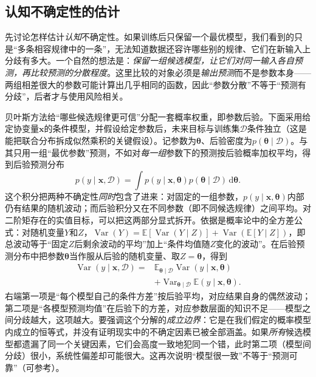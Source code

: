 \subsection{认知不确定性的估计}
\label{sec:reliability-epistemic-estimation}

先讨论怎样估计\emph{认知}不确定性。如果训练后只保留一个最优模型，我们看到的只是“多条相容规律中的一条”，无法知道数据还容许哪些别的规律、它们在新输入上分歧有多大。一个自然的想法是：\emph{保留一组候选模型，让它们对同一输入各自预测，再比较预测的分散程度}。这里比较的对象必须是\emph{输出预测}而不是参数本身——两组相差很大的参数可能计算出几乎相同的函数，因此“参数分散”不等于“预测有分歧”，后者才与使用风险相关。

贝叶斯方法给“哪些候选规律更可信”分配一套概率权重，即参数后验。下面采用给定协变量$\bm{x}$的条件模型，并假设给定参数后，未来目标与训练集$\mathcal D$条件独立（这是能把联合分布拆成似然乘积的关键假设）。记参数为$\bm{\theta}$、后验密度为$p(\bm{\theta}\mid\mathcal D)$。与其只用一组“最优参数”预测，不如对\emph{每一组}参数下的预测按后验概率加权平均，得到后验预测分布
\begin{equation}
 p(y\mid\bm{x},\mathcal D)
 =\int p(y\mid\bm{x},\bm{\theta})
       p(\bm{\theta}\mid\mathcal D)\,\mathrm d\bm{\theta}.
 \label{eq:reliability-posterior-predictive}
\end{equation}
这个积分把两种不确定性\emph{同时}包含了进来：对固定的一组参数，$p(y\mid\bm{x},\bm{\theta})$内部仍有结果的随机波动；而后验积分又在不同参数（即不同候选规律）之间平均。对二阶矩存在的实值目标，可以把这两部分显式拆开。依据是概率论中的全方差公式：对随机变量$Y$和$Z$，$\operatorname{Var}(Y)=\mathbb E[\operatorname{Var}(Y\mid Z)]+\operatorname{Var}(\mathbb E[Y\mid Z])$，即总波动等于“固定$Z$后剩余波动的平均”加上“条件均值随$Z$变化的波动”。在后验预测分布中把参数$\bm\theta$当作服从后验的随机变量、取$Z=\bm\theta$，得到
\begin{equation}
 \begin{aligned}
 \operatorname{Var}(y\mid\bm{x},\mathcal D)
 ={}&\mathbb E_{\bm{\theta}\mid\mathcal D}
       \operatorname{Var}(y\mid\bm{x},\bm{\theta})\\
 &+\operatorname{Var}_{\bm{\theta}\mid\mathcal D}
       \mathbb E(y\mid\bm{x},\bm{\theta}).
 \end{aligned}
 \label{eq:reliability-variance-decomposition}
\end{equation}
右端第一项是“每个模型自己的条件方差”按后验平均，对应结果自身的偶然波动；第二项是“各模型预测均值”在后验下的方差，对应参数层面的知识不足——模型之间分歧越大，这项越大。要强调这个分解的\emph{成立边界}：它是在我们假定的概率模型内成立的恒等式，并没有证明现实中的不确定因素已被全部涵盖。如果\emph{所有}候选模型都遗漏了同一个关键因素，它们会高度一致地犯同一个错，此时第二项（模型间分歧）很小，系统性偏差却可能很大。这再次说明“模型很一致”不等于“预测可靠”（可参考）。

